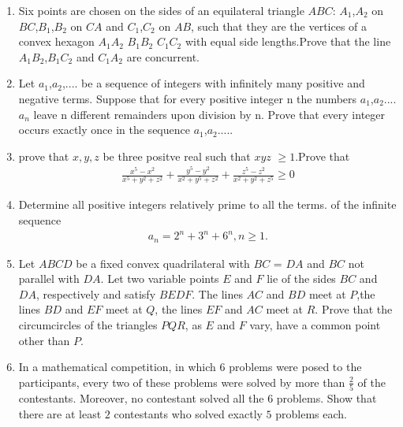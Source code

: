 \documentclass[12pt,-letter paper]{article}
\begin{document}
                                            \begin{enumerate}
   \item Six points are chosen on the sides of an equilateral triangle $ABC$: $A_1$,$A_2$ on $BC$,$B_1$,$B_2$ on $CA$ and $C_1$,$C_2$ on $AB$, such that they are the vertices of a convex hexagon $A_1A_2$ $B_1B_2$ $C_1C_2$ with equal side lengths.Prove that the line $A_1B_2$,$B_1C_2$ and $C_1A_2$ are concurrent.
   \item Let $a_1$,$a_2$,.... be a sequence of integers with infinitely many positive and negative terms. Suppose that for every positive integer n the numbers $a_1$,$a_2$....$a_n$ leave n different remainders upon division by n. Prove that every integer occurs exactly once in the sequence $a_1$,$a_2$.....
   \item prove that $x,y,z$ be three positve real such that $xyz$ $\geq{1}$.Prove that 
\begin{align*}
\frac{x^5-x^2}{x^5+y^2+z^2} + \frac{y^5-y^2}{x^2+y^5+z^2} + \frac{z^5-z^2}{x^2+y^2+z^5} \geq{0}
\end{align*}
   \item Determine all positive integers relatively prime to all the terms. of the infinite sequence
\begin{align*}
a_n={2^n}+{3^n}+{6^n},n\geq{1}.
\end{align*}
    \item Let $ABCD$ be a fixed convex quadrilateral with $BC$ = $DA$ and $BC$ not parallel with $DA$. Let two variable points $E$ and $F$ lie of the sides $BC$ and $DA$, respectively and satisfy $BEDF$. The lines $AC$ and $BD$ meet at $P$,the lines $BD$ and $EF$ meet at $Q$, the lines $EF$ and $AC$ meet at $R$.
Prove that the circumcircles of the triangles $PQR$, as $E$ and $F$ vary, have a common point other than $P$.
   \item In a mathematical competition, in which $6$ problems were posed to the participants, every two of these problems were solved by more than $\frac{2}{5}$ of the contestants. Moreover, no contestant solved all the $6$ problems. Show that there are at least $2$ contestants who solved exactly $5$ problems each.
	   
\end{enumerate}
\end{document}
